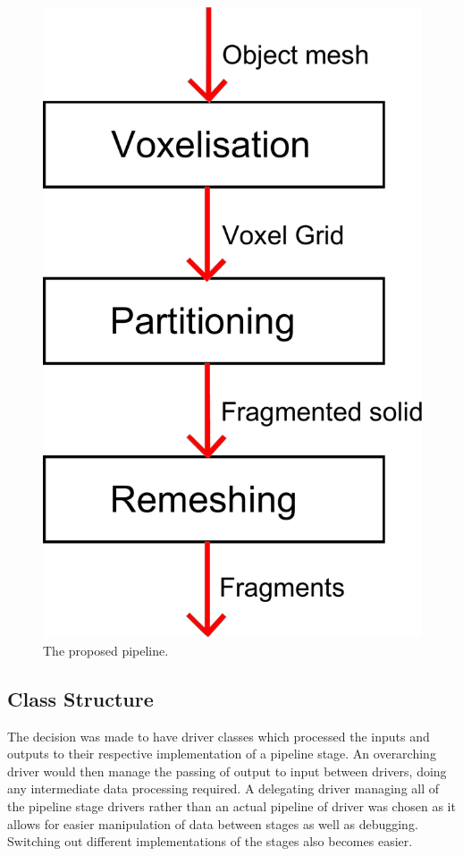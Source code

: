 \begin{figure}
\centerline{\includegraphics[scale=0.3]{pipeline13.pdf}}
\caption{The proposed pipeline.}
\label{fig:2.1}
\end{figure}

\subsection{Class Structure}


The decision was made to have driver classes which processed the inputs and outputs to their respective implementation of a pipeline stage. An overarching driver would then manage the passing of output to input between drivers, doing any intermediate data processing required. A delegating driver managing all of the pipeline stage drivers rather than an actual pipeline of driver was chosen as it allows for easier manipulation of data between stages as well as debugging. Switching out different implementations of the stages also becomes easier.

